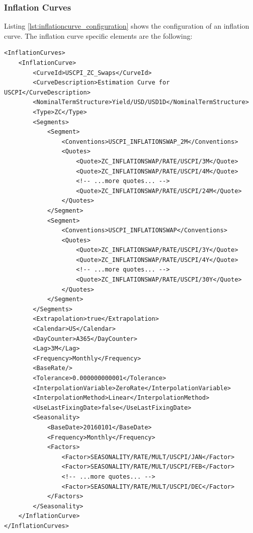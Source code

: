 \subsubsection{Inflation Curves}

Listing \ref{lst:inflationcurve_configuration} shows the configuration of an inflation curve. The inflation curve specific
elements are the following:

\begin{longlisting}
\begin{verbatim}
<InflationCurves>
    <InflationCurve>
        <CurveId>USCPI_ZC_Swaps</CurveId>
        <CurveDescription>Estimation Curve for USCPI</CurveDescription>
        <NominalTermStructure>Yield/USD/USD1D</NominalTermStructure>
        <Type>ZC</Type>
        <Segments>
            <Segment>
                <Conventions>USCPI_INFLATIONSWAP_2M</Conventions>
                <Quotes>
                    <Quote>ZC_INFLATIONSWAP/RATE/USCPI/3M</Quote>
                    <Quote>ZC_INFLATIONSWAP/RATE/USCPI/4M</Quote>
                    <!-- ...more quotes... -->
                    <Quote>ZC_INFLATIONSWAP/RATE/USCPI/24M</Quote>
                </Quotes>
            </Segment>
            <Segment>
                <Conventions>USCPI_INFLATIONSWAP</Conventions>
                <Quotes>
                    <Quote>ZC_INFLATIONSWAP/RATE/USCPI/3Y</Quote>
                    <Quote>ZC_INFLATIONSWAP/RATE/USCPI/4Y</Quote>
                    <!-- ...more quotes... -->
                    <Quote>ZC_INFLATIONSWAP/RATE/USCPI/30Y</Quote>
                </Quotes>
            </Segment>
        </Segments>
        <Extrapolation>true</Extrapolation>
        <Calendar>US</Calendar>
        <DayCounter>A365</DayCounter>
        <Lag>3M</Lag>
        <Frequency>Monthly</Frequency>
        <BaseRate/>
        <Tolerance>0.000000000001</Tolerance>
        <InterpolationVariable>ZeroRate</InterpolationVariable>
        <InterpolationMethod>Linear</InterpolationMethod>
        <UseLastFixingDate>false</UseLastFixingDate>
        <Seasonality>
            <BaseDate>20160101</BaseDate>
            <Frequency>Monthly</Frequency>
            <Factors>
                <Factor>SEASONALITY/RATE/MULT/USCPI/JAN</Factor>
                <Factor>SEASONALITY/RATE/MULT/USCPI/FEB</Factor>
                <!-- ...more quotes... -->
                <Factor>SEASONALITY/RATE/MULT/USCPI/DEC</Factor>
            </Factors>
        </Seasonality>
    </InflationCurve>
</InflationCurves>
\end{verbatim}
\caption{Inflation Curve Configuration}
\label{lst:inflationcurve_configuration}
\end{longlisting}

